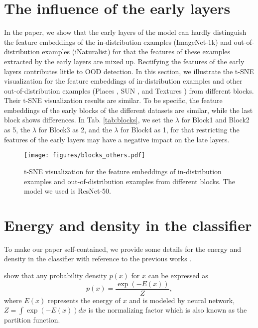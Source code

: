 \documentclass{article}
\begin{document}
\section{The influence of the early layers}\label{App:early}
In the paper, we show that the early layers of the model can hardly distinguish the feature embeddings of the in-distribution examples (ImageNet-1k) and out-of-distribution examples (iNaturalist) for that the features of these examples extracted by the early layers are mixed up. Rectifying the features of the early layers contributes little to OOD detection.
In this section, we illustrate the t-SNE visualization for the feature embeddings of in-distribution examples and other out-of-distribution examples (Places \cite{zhou2017places}, SUN \cite{xiao2010sun}, and Textures \cite{cimpoi2014Texture}) from different blocks. Their t-SNE visualization results are similar. To be specific, the feature embeddings of the early blocks of the different datasets are similar, while the last block shows differences. In Tab. \ref{tab:blocks}, we set the $\lambda$ for Block1 and Block2 as 5, the $\lambda$ for Block3 as 2, and the $\lambda$ for Block4 as 1, for that restricting the features of the early layers may have a negative impact on the late layers.

\begin{figure}[htbp]
\centering
\texttt{[image: figures/blocks\_others.pdf]}
\caption{t-SNE visualization for the feature embeddings of in-distribution examples and out-of-distribution examples from different blocks. The model we used is ResNet-50.}
\label{img:other_blocks}
\end{figure}


\section{Energy and density in the classifier}\label{App:energy}

 To make our paper self-contained, we provide some details for the energy and density in the classifier with reference to the previous works \cite{energyrobust,grathwohl2019your,liu2020energy}.

\citet{lecun2006} show that any probability density $p(x)$ for $x$ can be expressed as
\begin{equation}
    p(x) = \frac{\exp(-E(x))}{Z}, 
\label{px0_}
\end{equation}   
where $E(x)$ represents the energy of $x$ and is modeled by neural network, $Z = \int\exp(-E(x))dx$ is the normalizing factor which is also known as the partition function.
\end{document}
